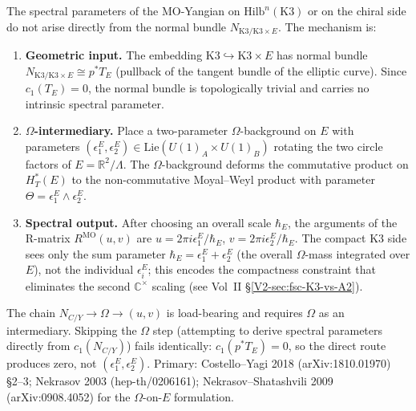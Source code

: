 \begin{remark}
\label{rem:feyn-W16-omega-intermediary}
The spectral parameters of the MO-Yangian on
$\mathrm{Hilb}^n(\mathrm K3)$ or on the chiral side do not arise
directly from the normal bundle $N_{\mathrm{K3}/\mathrm{K3} \times E}$.
The mechanism is:
\begin{enumerate}
\item \textbf{Geometric input.} The embedding $\mathrm{K3} \hookrightarrow
 \mathrm{K3} \times E$ has normal bundle
 $N_{\mathrm{K3}/\mathrm{K3} \times E} \cong p^* T_E$ (pullback of
 the tangent bundle of the elliptic curve). Since $c_1(T_E) = 0$,
 the normal bundle is topologically trivial and carries no intrinsic
 spectral parameter.
\item \textbf{$\Omega$-intermediary.} Place a two-parameter
 $\Omega$-background on $E$ with parameters
 $(\epsilon_1^E, \epsilon_2^E) \in
 \mathrm{Lie}(U(1)_A \times U(1)_B)$ rotating the two circle
 factors of $E = \mathbb R^2 / \Lambda$. The $\Omega$-background
 deforms the commutative product on $H^*_T(E)$ to the non-commutative
 Moyal--Weyl product with parameter $\Theta = \epsilon_1^E
 \wedge \epsilon_2^E$.
\item \textbf{Spectral output.} After choosing an overall scale
 $\hbar_E$, the arguments of the R-matrix $R^{\mathrm{MO}}(u, v)$ are
 $u = 2\pi i \epsilon_1^E/\hbar_E$,
 $v = 2\pi i \epsilon_2^E/\hbar_E$.
 The compact K3 side sees only the sum parameter
 $\hbar_E = \epsilon_1^E + \epsilon_2^E$ (the overall $\Omega$-mass
 integrated over $E$),
 not the individual $\epsilon_i^E$; this encodes the compactness
 constraint that eliminates the second $\mathbb{C}^\times$ scaling
 (see Vol~II \S\ref{V2-sec:fsc-K3-vs-A2}).
\end{enumerate}
The chain $N_{C/Y} \to \Omega \to (u, v)$ is
load-bearing and requires $\Omega$ as an intermediary. Skipping the
$\Omega$ step (attempting to derive spectral parameters directly from
$c_1(N_{C/Y})$) fails identically: $c_1(p^* T_E) = 0$, so the direct
route produces zero, not $(\epsilon_1^E, \epsilon_2^E)$. Primary:
Costello--Yagi 2018 (arXiv:1810.01970) \S2--3; Nekrasov 2003
(hep-th/0206161); Nekrasov--Shatashvili 2009 (arXiv:0908.4052)
for the $\Omega$-on-$E$ formulation.
\end{remark}

